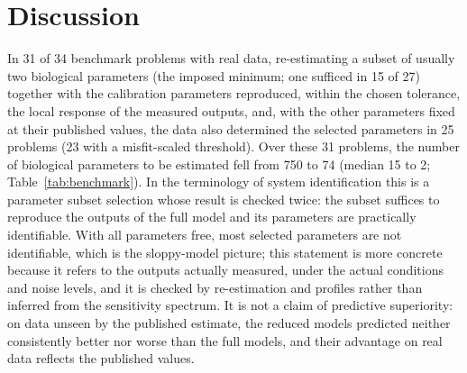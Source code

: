 \documentclass[pdflatex,sn-nature]{sn-jnl}
\theoremstyle{plain}
\begin{document}
\section*{Discussion}\label{sec:discussion}

In 31 of 34 benchmark problems with real data, re-estimating a subset of usually two biological parameters (the imposed minimum; one sufficed in 15 of 27) together with the calibration parameters reproduced, within the chosen tolerance, the local response of the measured outputs, and, with the other parameters fixed at their published values, the data also determined the selected parameters in 25 problems (23 with a misfit-scaled threshold). Over these 31 problems, the number of biological parameters to be estimated fell from 750 to 74 (median 15 to 2; Table~\ref{tab:benchmark}). In the terminology of system identification this is a parameter subset selection\cite{bib40} whose result is checked twice: the subset suffices to reproduce the outputs of the full model and its parameters are practically identifiable. With all parameters free, most selected parameters are not identifiable, which is the sloppy-model picture\cite{bib15,bib41}; this statement is more concrete because it refers to the outputs actually measured, under the actual conditions and noise levels, and it is checked by re-estimation and profiles rather than inferred from the sensitivity spectrum. It is not a claim of predictive superiority: on data unseen by the published estimate, the reduced models predicted neither consistently better nor worse than the full models, and their advantage on real data reflects the published values.
\end{document}
